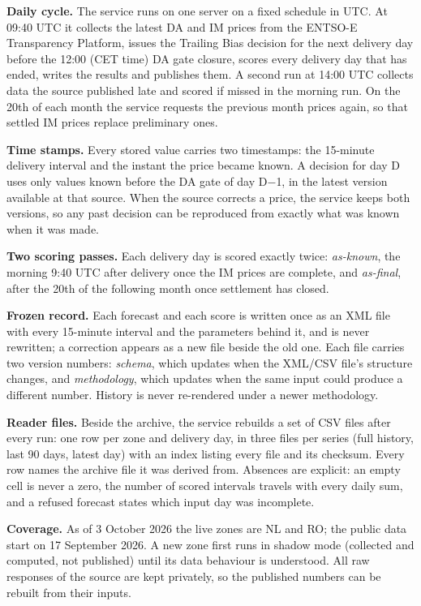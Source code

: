 \documentclass[11pt,a4paper]{article}
\begin{document}
\textbf{Daily cycle.} The service runs on one server on a fixed schedule in UTC. At 09:40 UTC it collects the latest DA and IM prices from the ENTSO-E Transparency Platform, issues the Trailing Bias decision for the next delivery day before the 12:00 (CET time) DA gate closure, scores every delivery day that has ended, writes the results and publishes them. A second run at 14:00 UTC collects data the source published late and scored if missed in the morning run. On the 20th of each month the service requests the previous month prices again, so that settled IM prices replace preliminary ones.

\textbf{Time stamps.} Every stored value carries two timestamps: the 15-minute delivery interval and the instant the price became known. A decision for day D uses only values known before the DA gate of day D$-$1, in the latest version available at that source. When the source corrects a price, the service keeps both versions, so any past decision can be reproduced from exactly what was known when it was made.

\textbf{Two scoring passes.} Each delivery day is scored exactly twice: \emph{as-known}, the morning 9:40 UTC after delivery once the IM prices are complete, and \emph{as-final}, after the 20th of the following month once settlement has closed.

\textbf{Frozen record.} Each forecast and each score is written once as an XML file with every 15-minute interval and the parameters behind it, and is never rewritten; a correction appears as a new file beside the old one. Each file carries two version numbers: \emph{schema}, which updates when the XML/CSV file's structure changes, and \emph{methodology}, which updates when the same input could produce a different number. History is never re-rendered under a newer methodology.

\textbf{Reader files.} Beside the archive, the service rebuilds a set of CSV files after every run: one row per zone and delivery day, in three files per series (full history, last 90 days, latest day) with an index listing every file and its checksum. Every row names the archive file it was derived from. Absences are explicit: an empty cell is never a zero, the number of scored intervals travels with every daily sum, and a refused forecast states which input day was incomplete.

\textbf{Coverage.} As of 3 October 2026 the live zones are NL and RO; the public data start on 17 September 2026. A new zone first runs in shadow mode (collected and computed, not published) until its data behaviour is understood. All raw responses of the source are kept privately, so the published numbers can be rebuilt from their inputs.
\end{document}
